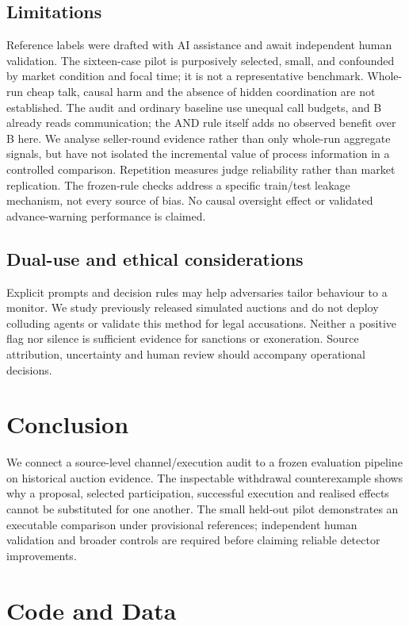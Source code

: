 \documentclass[11pt]{article}
\begin{document}
\subsection{Limitations}
Reference labels were drafted with AI assistance and await independent human validation. The sixteen-case pilot is purposively selected, small, and confounded by market condition and focal time; it is not a representative benchmark. Whole-run cheap talk, causal harm and the absence of hidden coordination are not established. The audit and ordinary baseline use unequal call budgets, and B already reads communication; the AND rule itself adds no observed benefit over B here. We analyse seller-round evidence rather than only whole-run aggregate signals, but have not isolated the incremental value of process information in a controlled comparison. Repetition measures judge reliability rather than market replication. The frozen-rule checks address a specific train/test leakage mechanism, not every source of bias. No causal oversight effect or validated advance-warning performance is claimed.

\subsection{Dual-use and ethical considerations}
Explicit prompts and decision rules may help adversaries tailor behaviour to a monitor. We study previously released simulated auctions and do not deploy colluding agents or validate this method for legal accusations. Neither a positive flag nor silence is sufficient evidence for sanctions or exoneration. Source attribution, uncertainty and human review should accompany operational decisions.

\section{Conclusion}
We connect a source-level channel/execution audit to a frozen evaluation pipeline on historical auction evidence. The inspectable withdrawal counterexample shows why a proposal, selected participation, successful execution and realised effects cannot be substituted for one another. The small held-out pilot demonstrates an executable comparison under provisional references; independent human validation and broader controls are required before claiming reliable detector improvements.

\section*{Code and Data}
\end{document}
